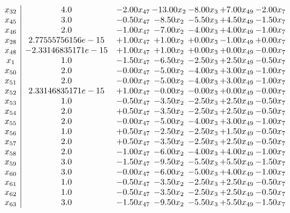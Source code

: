 \documentclass[8pt]{article}
\begin{document}
\[\begin{array}{c| c c@{\hskip 2pt} c@{\hskip 2pt} c@{\hskip 2pt} c@{\hskip 2pt} c@{\hskip 2pt} }
 x_{32}   &  4.0 & -2.00 x_{47} & -13.00 x_{2} & -8.00 x_{3} & +  7.00 x_{49} & -2.00 x_{7}\\
 x_{45}   &  3.0 & -0.50 x_{47} & -8.50 x_{2} & -5.50 x_{3} & +  4.50 x_{49} & -1.50 x_{7}\\
 x_{46}   &  2.0 & -1.00 x_{47} & -7.00 x_{2} & -4.00 x_{3} & +  4.00 x_{49} & -1.00 x_{7}\\
 x_{28}   &  2.77555756156e-15 & +  1.00 x_{47} & +  1.00 x_{2} & +  0.00 x_{3} & -1.00 x_{49} & +  0.00 x_{7}\\
 x_{48}   &  -2.33146835171e-15 & +  1.00 x_{47} & +  1.00 x_{2} & +  0.00 x_{3} & +  0.00 x_{49} & -0.00 x_{7}\\
 x_{1}   &  1.0 & -1.50 x_{47} & -6.50 x_{2} & -2.50 x_{3} & +  2.50 x_{49} & -0.50 x_{7}\\
 x_{50}   &  2.0 & -0.00 x_{47} & -5.00 x_{2} & -4.00 x_{3} & +  3.00 x_{49} & -1.00 x_{7}\\
 x_{51}   &  2.0 & -0.00 x_{47} & -5.00 x_{2} & -4.00 x_{3} & +  3.00 x_{49} & -1.00 x_{7}\\
 x_{52}   &  2.33146835171e-15 & +  1.00 x_{47} & -0.00 x_{2} & -0.00 x_{3} & +  0.00 x_{49} & -0.00 x_{7}\\
 x_{53}   &  1.0 & -0.50 x_{47} & -3.50 x_{2} & -2.50 x_{3} & +  2.50 x_{49} & -0.50 x_{7}\\
 x_{54}   &  2.0 & +  0.50 x_{47} & -3.50 x_{2} & -2.50 x_{3} & +  2.50 x_{49} & -0.50 x_{7}\\
 x_{55}   &  2.0 & -0.00 x_{47} & -5.00 x_{2} & -4.00 x_{3} & +  3.00 x_{49} & -1.00 x_{7}\\
 x_{56}   &  1.0 & +  0.50 x_{47} & -2.50 x_{2} & -2.50 x_{3} & +  1.50 x_{49} & -0.50 x_{7}\\
 x_{57}   &  2.0 & +  0.50 x_{47} & -3.50 x_{2} & -2.50 x_{3} & +  2.50 x_{49} & -0.50 x_{7}\\
 x_{58}   &  2.0 & -1.00 x_{47} & -6.00 x_{2} & -4.00 x_{3} & +  4.00 x_{49} & -1.00 x_{7}\\
 x_{59}   &  3.0 & -1.50 x_{47} & -9.50 x_{2} & -5.50 x_{3} & +  5.50 x_{49} & -1.50 x_{7}\\
 x_{60}   &  3.0 & -0.00 x_{47} & -6.00 x_{2} & -5.00 x_{3} & +  4.00 x_{49} & -1.00 x_{7}\\
 x_{61}   &  1.0 & -0.50 x_{47} & -3.50 x_{2} & -2.50 x_{3} & +  2.50 x_{49} & -0.50 x_{7}\\
 x_{62}   &  1.0 & -0.50 x_{47} & -3.50 x_{2} & -2.50 x_{3} & +  2.50 x_{49} & -0.50 x_{7}\\
 x_{63}   &  3.0 & -1.50 x_{47} & -9.50 x_{2} & -5.50 x_{3} & +  5.50 x_{49} & -1.50 x_{7}\\

\end{array}\]
\end{document}
